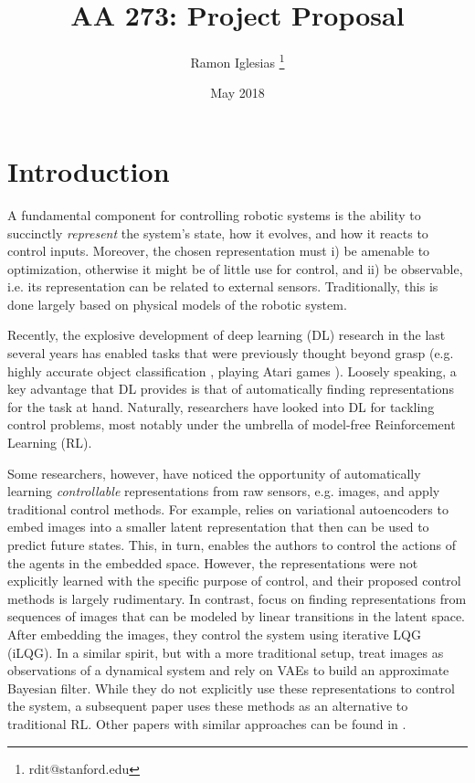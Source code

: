 \documentclass[12pt, letterpaper]{article}
\title{AA 273: Project Proposal}
\author{Ramon Iglesias \thanks{rdit@stanford.edu}}
\date{May 2018}
\begin{document}
\maketitle

\section{Introduction}

A fundamental component for controlling robotic systems is the ability to succinctly \textit{represent} the system's state, how it evolves, and how it reacts to control inputs. Moreover, the chosen representation must i) be amenable to optimization, otherwise it might be of little use for control, and ii) be observable, i.e. its representation can be related to external sensors.
Traditionally, this is done largely based on physical models of the robotic system.

Recently, the explosive development of deep learning (DL) research in the last several years has enabled tasks that were previously thought beyond grasp (e.g. highly accurate object classification \cite{krizhevsky2012imagenet}, playing Atari games \cite{mnih2015human}). Loosely speaking, a key advantage that DL provides is that of automatically finding representations for the task at hand. Naturally, researchers have looked into DL for tackling control problems, most notably under the umbrella of model-free Reinforcement Learning (RL).

Some researchers, however, have noticed the opportunity of automatically learning \textit{controllable} representations from raw sensors, e.g. images, and apply traditional control methods.
For example, \cite{ha2018world} relies on variational autoencoders \cite{kingma2013auto} to embed images into a smaller latent representation that then can be used to predict future states. This, in turn, enables the authors to control the actions of the agents in the embedded space. However, the representations were not explicitly learned with the specific purpose of control, and their proposed control methods is largely rudimentary. 
In contrast, \cite{watter2015embed,banijamali2017robust} focus on finding representations from sequences of images that can be modeled by linear transitions in the latent space. After embedding the images, they control the system using iterative LQG (iLQG).
In a similar spirit, but with a more traditional setup, \cite{karl2016deep,krishnan2015deep} treat images as observations of a dynamical system and rely on VAEs to build an approximate Bayesian filter. While they do not explicitly use these representations to control the system, a subsequent paper \cite{karl2017unsupervised} uses these methods as an alternative to traditional RL.
Other papers with similar approaches can be found in \cite{lesort2018state}.
\end{document}
